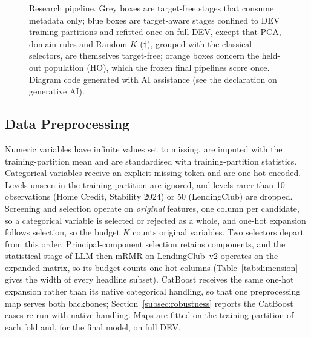 \documentclass[final,5p,twocolumn]{elsarticle}
\newcommand{\Kfeat}{K}
\begin{document}
\begin{figure}[htbp]
\caption{Research pipeline. Grey boxes are target-free stages that consume metadata only; blue boxes are target-aware stages confined to DEV training partitions and refitted once on full DEV, except that PCA, domain rules and Random $\Kfeat$ ($\dagger$), grouped with the classical selectors, are themselves target-free; orange boxes concern the held-out population (HO), which the frozen final pipelines score once. Diagram code generated with AI assistance (see the declaration on generative AI).}
\label{fig:pipeline}
\end{figure}

\subsection{Data Preprocessing}
\label{subsec:preprocessing}

Numeric variables have infinite values set to missing, are imputed with the training-partition mean and are standardised with training-partition statistics. Categorical variables receive an explicit missing token and are one-hot encoded. Levels unseen in the training partition are ignored, and levels rarer than 10 observations (Home Credit, Stability 2024) or 50 (LendingClub) are dropped. Screening and selection operate on \emph{original} features, one column per candidate, so a categorical variable is selected or rejected as a whole, and one-hot expansion follows selection, so the budget $\Kfeat$ counts original variables. Two selectors depart from this order. Principal-component selection retains components, and the statistical stage of LLM then mRMR on LendingClub~v2 operates on the expanded matrix, so its budget counts one-hot columns (Table~\ref{tab:dimension} gives the width of every headline subset). CatBoost receives the same one-hot expansion rather than its native categorical handling, so that one preprocessing map serves both backbones; Section~\ref{subsec:robustness} reports the CatBoost cases re-run with native handling. Maps are fitted on the training partition of each fold and, for the final model, on full DEV.
\end{document}
